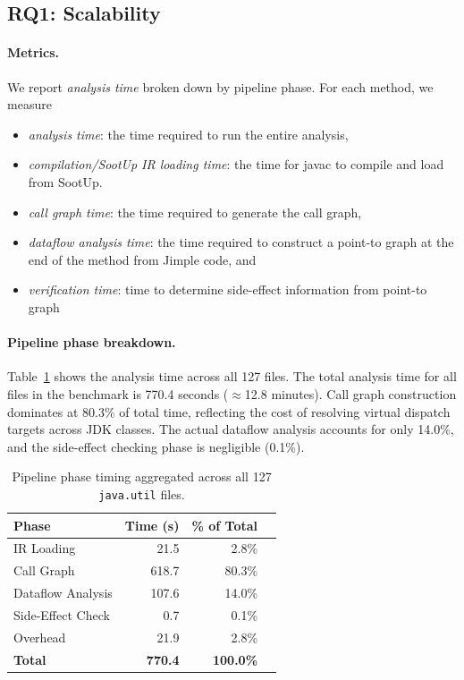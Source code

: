 \subsection{RQ1: Scalability}


\paragraph{Metrics.}
We report \emph{analysis time} broken down by pipeline phase. For each method, we measure
\begin{itemize}  
\item \textit{analysis time}: the time required to run the entire analysis, 
\item \textit{compilation/SootUp IR loading time}: the time for javac to compile and load from SootUp.  
\item \textit{call graph time}: the time required to generate the call graph,
\item \textit{dataflow analysis time}: the time required to construct a point-to graph at the end of the method from Jimple code, and
\item \textit{verification time}: time to determine side-effect information from point-to graph 
\end{itemize}


\paragraph{Pipeline phase breakdown.}
Table~\ref{tab:pipeline} shows the analysis time across all 127 files.
The total analysis time for all files in the benchmark is 770.4 seconds ($\approx$12.8 minutes).
Call graph construction dominates at 80.3\% of total time, reflecting the cost of resolving virtual dispatch targets across JDK classes.
The actual dataflow analysis accounts for only 14.0\%, and the side-effect checking phase is negligible (0.1\%).

\begin{table}[h]
\centering
\caption{Pipeline phase timing aggregated across all 127 \texttt{java.util} files.}
\label{tab:pipeline}
\begin{tabular}{lrrr}
\toprule
\textbf{Phase} & \textbf{Time (s)} & \textbf{\% of Total} \\
\midrule
IR Loading          &   21.5 &  2.8\% \\
Call Graph          &  618.7 & 80.3\% \\
Dataflow Analysis   &  107.6 & 14.0\% \\
Side-Effect Check   &    0.7 &  0.1\% \\
Overhead            &   21.9 &  2.8\% \\
\midrule
\textbf{Total}      & \textbf{770.4} & \textbf{100.0\%} \\
\bottomrule
\end{tabular}
\end{table}


